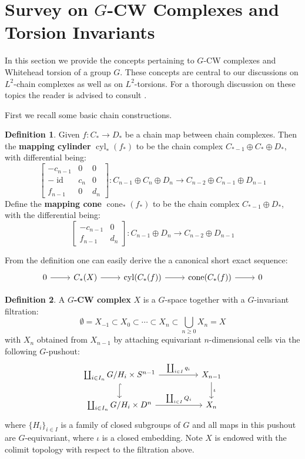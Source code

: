 \documentclass[11pt]{report}
\theoremstyle{definition}
\newtheorem{Def}{Definition}[chapter]
\theoremstyle{plain}
\DeclareMathOperator{\id}{id}
\DeclareMathOperator{\cone}{cone}
\DeclareMathOperator{\cyl}{cyl}
\begin{document}
\section{Survey on $G$-CW Complexes and Torsion Invariants}
In this section we provide the concepts pertaining to $G$-CW complexes and Whitehead torsion of a group $G$. These concepts are central to our discussions on $L^2$-chain complexes as well as on $L^2$-torsions. For a thorough discussion on these topics the reader is advised to consult \cite[Chapter~II]{tom1987}.
\par First we recall some basic chain constructions. 
\begin{Def}
	Given $f: C_*\to D_*$ be a chain map between chain complexes. Then the \textbf{mapping cylinder} $\cyl_*(f_*)$ to be the chain complex $C_{*-1}\oplus C_*\oplus D_*$, with differential being:
	\begin{equation}
	\begin{bmatrix}
	-c_{n-1} &0 &0\\ -\id & c_n & 0 \\ f_{n-1} & 0 & d_n
	\end{bmatrix}:C_{n-1}\oplus C_n\oplus D_n\longrightarrow C_{n-2}\oplus C_{n-1}\oplus D_{n-1}
	\end{equation}
	Define the \textbf{mapping cone} $\cone_*(f_*)$ to be the chain complex $C_{*-1}\oplus D_*$, with the differential being:
	\begin{equation}
	\begin{bmatrix}
	-c_{n-1} &0\\ f_{n-1} &d_n
	\end{bmatrix}:C_{n-1}\oplus D_n\longrightarrow C_{n-2}\oplus D_{n-1}
	\end{equation}
\end{Def}
From the definition one can easily derive the a canonical short exact sequence:
\begin{equation}\label{1.33}
\begin{tikzcd}
0 \rar &C_*(X)\rar &\cyl(C_*(f))\rar &\cone(C_*(f))\rar &0
\end{tikzcd}
\end{equation}
\begin{Def}\label{1.25}
	A \textbf{$G$-CW complex} $X$ is a $G$-space together with a $G$-invariant filtration:
	\begin{equation*}
	\emptyset=X_{-1}\subset X_0\subset \cdots \subset X_n\subset \bigcup_{n\geq 0}X_n=X
	\end{equation*}
	with $X_n$ obtained from $X_{n-1}$ by attaching equivariant $n$-dimensional cells via the following $G$-pushout:
	\begin{equation}
	\begin{tikzcd}[column sep=huge]
	\coprod_{i\in I_n} G/H_i\times S^{n-1} \dar[hook]\rar{\coprod_{i\in I}q_i} &X_{n-1}\dar{\iota}\\
	\coprod_{i\in I_n}G/H_i\times D^n\rar{\coprod_{i\in I}Q_i}&X_n
	\end{tikzcd}
	\end{equation}
	where $\{H_i\}_{i\in I}$ is a family of closed subgroups of $G$ and all maps in this pushout are $G$-equivariant, where $\iota$ is a closed embedding. Note $X$ is endowed with the colimit topology with respect to the filtration above.
\end{Def}
\end{document}
